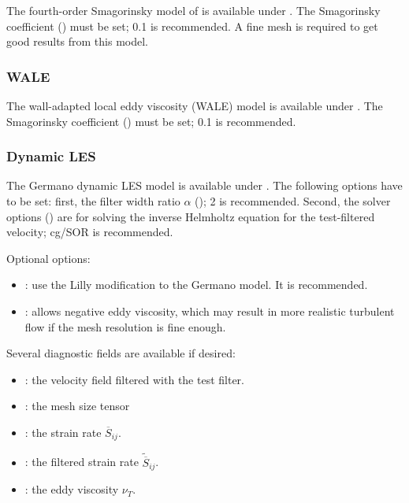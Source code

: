 The fourth-order Smagorinsky model of \citet{bentham2003} is available under . The Smagorinsky coefficient () must be set; 0.1 is recommended. A fine mesh is required to get good results from this model.

\subsubsection{WALE}

The wall-adapted local eddy viscosity (WALE) model is available under . The Smagorinsky coefficient () must be set; 0.1 is recommended.

\subsubsection{Dynamic LES}

The Germano dynamic LES model is available under . The following options have to be set: first, the filter width ratio $\alpha$ (); 2 is recommended. Second, the solver options () are for solving the inverse Helmholtz equation for the test-filtered velocity; cg/SOR is recommended.

Optional options:
\begin{itemize}
\item {}: use the Lilly modification to the Germano model. It is recommended.
\item {}: allows negative eddy viscosity, which may result in more realistic turbulent flow if the mesh resolution is fine enough.
\end{itemize}

Several diagnostic fields are available if desired:

\begin{itemize}
\item {}: the velocity field filtered with the test filter.
\item {}: the mesh size tensor
\item {}: the strain rate $\overline S_{ij}$.
\item {}: the filtered strain rate $\widetilde{\overline S}_{ij}$.
\item {}: the eddy viscosity $\nu_T$.
\end{itemize}

